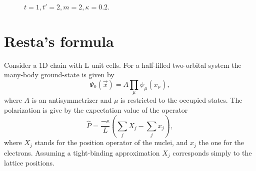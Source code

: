 \documentclass[twocolumn,amsmath,longbibliography,amssymb,superscriptaddress]{revtex4-1}
\begin{document}
\begin{figure}[h!]
\centering
{}
\caption{$t = 1, t'= 2, m=2, \kappa = 0.2 $. }
\label{lambdainh}
\end{figure}


 
\section{Resta's formula} 
 
Consider a 1D chain with L unit cells. For a half-filled two-orbital system the many-body ground-state is given by
\begin{equation}
\Psi_0(\vec{x}) = A\prod_{\mu} \psi_\mu (x_\mu),
\end{equation}
where $A$ is an antisymmetrizer and $\mu$ is restricted to the occupied states. The polarization is give by the expectation value of the operator
\begin{equation}
\hat{P}=\frac{-e}{L}\left(\sum_j X_j - \sum_j  x_j\right),
\end{equation}
where $X_j$ stands for the position operator of the nuclei, and $x_j$ the one for the electrons. Assuming a tight-binding approximation $X_j$ corresponds simply to the lattice positions.
\end{document}
